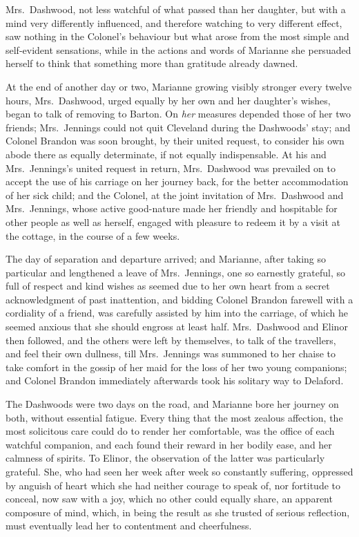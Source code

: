 \documentclass{article}
\begin{document}
Mrs.\ Dashwood, not less watchful of what passed than
her daughter, but with a mind very differently influenced,
and therefore watching to very different effect,
saw nothing in the Colonel's behaviour but what arose
from the most simple and self-evident sensations, while in
the actions and words of Marianne she persuaded herself
to think that something more than gratitude already dawned.

At the end of another day or two, Marianne growing
visibly stronger every twelve hours, Mrs.\ Dashwood,
urged equally by her own and her daughter's wishes,
began to talk of removing to Barton.  On \emph{her} measures
depended those of her two friends; Mrs.\ Jennings could
not quit Cleveland during the Dashwoods' stay; and Colonel
Brandon was soon brought, by their united request,
to consider his own abode there as equally determinate,
if not equally indispensable.  At his and Mrs.\ Jennings's
united request in return, Mrs.\ Dashwood was prevailed
on to accept the use of his carriage on her journey back,
for the better accommodation of her sick child; and the Colonel,
at the joint invitation of Mrs.\ Dashwood and Mrs.\ Jennings,
whose active good-nature made her friendly and hospitable
for other people as well as herself, engaged with pleasure
to redeem it by a visit at the cottage, in the course
of a few weeks.

The day of separation and departure arrived;
and Marianne, after taking so particular and lengthened
a leave of Mrs.\ Jennings, one so earnestly grateful, so full
of respect and kind wishes as seemed due to her own heart
from a secret acknowledgment of past inattention, and bidding
Colonel Brandon farewell with a cordiality of a friend,
was carefully assisted by him into the carriage, of which he
seemed anxious that she should engross at least half.
Mrs.\ Dashwood and Elinor then followed, and the others
were left by themselves, to talk of the travellers,
and feel their own dullness, till Mrs.\ Jennings was summoned
to her chaise to take comfort in the gossip of her maid
for the loss of her two young companions; and Colonel Brandon
immediately afterwards took his solitary way to Delaford.

The Dashwoods were two days on the road, and Marianne
bore her journey on both, without essential fatigue.
Every thing that the most zealous affection, the most
solicitous care could do to render her comfortable,
was the office of each watchful companion, and each
found their reward in her bodily ease, and her calmness
of spirits.  To Elinor, the observation of the latter
was particularly grateful.  She, who had seen her week
after week so constantly suffering, oppressed by anguish
of heart which she had neither courage to speak of,
nor fortitude to conceal, now saw with a joy, which no other
could equally share, an apparent composure of mind, which,
in being the result as she trusted of serious reflection,
must eventually lead her to contentment and cheerfulness.
\end{document}

